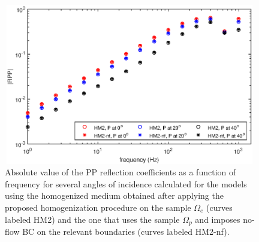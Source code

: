 \documentclass[draft]{agujournal2019}
\begin{document}
\begin{figure}[!ht]
\centering
        \includegraphics[width= 110mm, height=70mm]{rpp_2sandshaleUfrac2L12.eps}
\caption{Absolute value of the PP reflection coefficients as a function of frequency for several angles of incidence calculated for the models using the homogenized medium obtained after applying the proposed homogenization procedure on the sample $\Omega_e$ (curves labeled HM2) and the one that uses the sample $\Omega_p$ and imposes no-flow BC on the relevant boundaries (curves labeled HM2-nf).}
\label{fig.10}
\end{figure}
\end{document}
